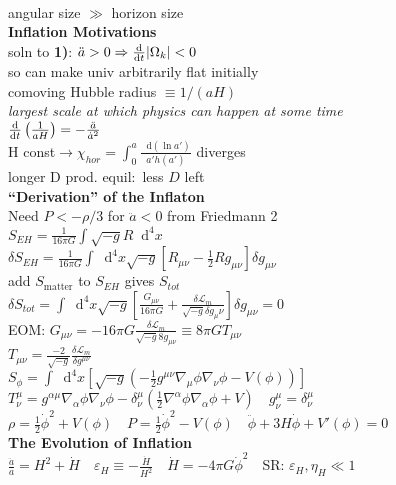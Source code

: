 \documentclass[12pt]{article}
\newcommand*\diff{\mathop{}\!\mathrm{d}}
\begin{document}
{	\\angular size $\gg$ horizon size
	\\\textbf{Inflation Motivations}
	\\soln to \textbf{1)}: $\ddot{a}>0 \Rightarrow \dv{}{t}\abs{\Omega_k}<0$ 
	\\so can make univ arbitrarily flat initially
	\\comoving Hubble radius $\equiv 1/(aH)$
	\\\textit{largest scale at which physics can happen at some time}
	\\$\dv{}{t}\left(\frac{1}{aH}\right)=-\frac{\ddot{a}}{\dot{a}^2}$
	\\H const$\rightarrow \chi_{hor}=\int_0^a\frac{\diff(\ln a')}{a'h(a')}$ diverges
	\\longer D prod. equil$:$ less $D$ left
	\\\textbf{``Derivation'' of the Inflaton}
	\\Need $P < -\rho/3$ for $\ddot{a} <0$ from Friedmann 2
	\\$S_{EH}=\frac{1}{16\pi G}\int\sqrt{-g}R\diff^4 x$
	\\$\delta S_{EH}=\frac{1}{16\pi G}\int\diff^4 x\sqrt{-g}\left[R_{\mu\nu}-\frac{1}{2}Rg_{\mu\nu}\right]\delta g_{\mu\nu}$
	\\add $S_\text{matter}$ to $S_{EH}$ gives $S_{tot}$
	\\$\delta S_{tot}=\int\diff^4 x\sqrt{-g}\left[\frac{G_{\mu\nu}}{16\pi G}+\frac{\delta\mathcal{L}_m}{\sqrt{-g}\delta g_\mu\nu}\right]\delta g_{\mu\nu}=0$
	\\EOM: $G_{\mu\nu}=-16\pi G \frac{\delta \mathcal{L}_m}{\sqrt{-g}8g_{\mu\nu}}\equiv 8\pi G T_{\mu\nu}$
	\\$T_{\mu\nu} = \frac{-2}{\sqrt{-g}}\frac{\delta\mathcal{L}_m}{\delta g^{\mu\nu}}$
	\\$S_\phi=\int\diff^4 x \left[\sqrt{-g}\left(-\frac{1}{2}g^{\mu\nu}\nabla_\mu\phi\nabla_\nu\phi - V(\phi)\right)\right]$
	\\$T_\nu^\mu=g^{\alpha\mu}\nabla_\alpha\phi\nabla_\nu\phi-\delta_\nu^\mu\left(\frac{1}{2}\nabla^\alpha\phi\nabla_\alpha\phi + V\right) \quad g^\mu_\nu=\delta^\mu_\nu$
	\\$\rho= \frac{1}{2}\dot{\phi}^2 + V(\phi) \quad P =\frac{1}{2}\dot{\phi}^2 - V(\phi) \quad \ddot{\phi}+3H\dot{\phi} + V'(\phi)=0$
	\\\textbf{The Evolution of Inflation}
	\\\vspace{0.1cm}$\frac{\ddot{a}}{a}=H^2+\dot{H} \quad \varepsilon_H\equiv -\frac{\dot{H}}{H^2} \quad \dot{H}=-4\pi G\dot{\phi}^2 \quad $SR: $\varepsilon_H,\eta_H \ll 1$
}
\end{document}
